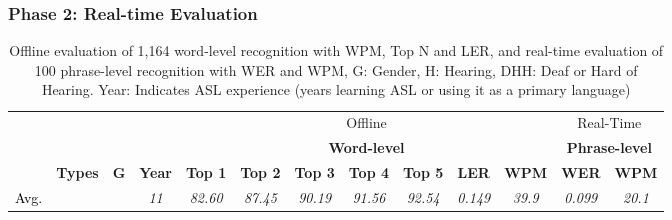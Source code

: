 \subsubsection{Phase 2: Real-time Evaluation}
\begin{table*}[t]
\caption{Offline evaluation of 1,164 word-level recognition with WPM, Top N and LER, and real-time evaluation of 100 phrase-level recognition with WER and WPM, G: Gender, H: Hearing, DHH: Deaf or Hard of Hearing. Year: Indicates ASL experience (years learning ASL or using it as a primary language)}
\begin{tabular}{cccc|ccccccc|cc}
\hline
\textbf{}                      & \textbf{}                           & \textbf{}                            & \textbf{}     & \multicolumn{7}{c|}{Offline}                                                                                                                                                                                                                      & \multicolumn{2}{c}{Real-Time}                       \\
\textbf{}                      & \textbf{}                           & \textbf{}                            & \textbf{}     & \multicolumn{7}{c|}{\textbf{Word-level}}                                                                                                                                                                                                          & \multicolumn{2}{c}{\textbf{Phrase-level}}           \\ \hline
\multicolumn{1}{c|}{\textbf{}} & \multicolumn{1}{c|}{\textbf{Types}} & \multicolumn{1}{c|}{\textbf{G}} & \textbf{Year} & \multicolumn{1}{c|}{\textbf{Top 1}} & \multicolumn{1}{c|}{\textbf{Top 2}} & \multicolumn{1}{c|}{\textbf{Top 3}} & \multicolumn{1}{c|}{\textbf{Top 4}} & \multicolumn{1}{c|}{\textbf{Top 5}} & \multicolumn{1}{c|}{\textbf{LER}}   & \textbf{WPM}  & \multicolumn{1}{c|}{\textbf{WER}}   & \textbf{WPM}  \\ \hline
\multicolumn{1}{c|}{\textcolor{black}{Avg.}}       & \multicolumn{1}{c|}{}               & \multicolumn{1}{c|}{}                & \textit{11}   & \multicolumn{1}{c|}{\textit{82.60}} & \multicolumn{1}{c|}{\textit{87.45}} & \multicolumn{1}{c|}{\textit{90.19}} & \multicolumn{1}{c|}{\textit{91.56}} & \multicolumn{1}{c|}{\textit{92.54}} & \multicolumn{1}{c|}{\textit{0.149}} & \textit{39.9} & \multicolumn{1}{c|}{\textit{0.099}} & \textit{20.1} \\ \hline

\end{tabular}
\end{table*}

